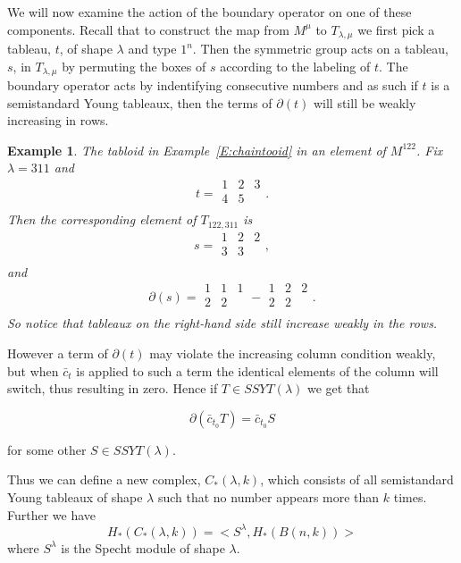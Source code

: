 \documentclass{elsart}
\newtheorem{example}[theorem]{Example}
\begin{document}
We will now examine the action of the boundary operator on one of these components. Recall that to construct the
map from $M^\mu$ to $T_{\lambda, \mu}$ we first pick a tableau, $t$,  of shape $\lambda$ and type $1^n$. Then the 
symmetric group acts on a tableau, $s$,  in $T_{\lambda, \mu}$ by permuting the boxes of $s$ according to the labeling of
$t$. The boundary operator acts by indentifying consecutive numbers and as such if $t$ is a semistandard Young tableaux, 
then the terms of $\partial(t)$ will still be weakly increasing in rows. 

\begin{example}
  The tabloid in Example~\ref{E:chaintooid} in an element of $M^{122}$. Fix $\lambda=311$ and 
  $$t = \begin{array}{ccc} 1 & 2 & 3 \\ 4 & 5 & \\ \end{array} .$$ Then the corresponding element of $T_{122, 311}$ is
  $$s = \begin{array}{ccc} 1 & 2 & 2 \\ 3 & 3\\ \end{array} ,$$ and 
  $$\partial(s) = \begin{array}{ccc} 1 & 1 & 1\\ 2 & 2\\ \end{array}  - \begin{array}{ccc} 1 & 2 & 2 \\ 2 & 2\\ 
    \end{array} .$$
  So notice that tableaux on the right-hand side still increase weakly in the rows.
\end{example}

However a term of $\partial(t)$ may violate the
increasing column condition weakly, but when ${\bar c}_t$ is applied to such a term the 
identical elements of the column will switch, thus resulting in zero. Hence if $T \in SSYT(\lambda)$ we get that

$$\partial({\bar c}_{t_0} T) = {\bar c}_{t_0} S$$

for some other $S \in SSYT(\lambda)$.


Thus we can define a new complex, 
$C_*(\lambda, k)$,  which consists of 
all semistandard Young tableaux of shape $\lambda$ such that no number appears more than $k$ times. Further we have
$$H_*(C_*(\lambda, k)) = <S^\lambda, H_*(B(n, k))>$$ where $S^\lambda$ is the Specht module of shape $\lambda$. 
\end{document}
